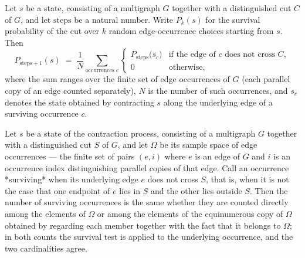 \begin{lemma}
\label{KargerTrace.survivalEventProb_succ}
\leanok
{}
Let $s$ be a state, consisting of a multigraph $G$ together with a distinguished cut $C$
of $G$, and let $\mathrm{steps}$ be a natural number. Write $P_k(s)$ for the survival
probability of the cut over $k$ random edge-occurrence choices starting from $s$. Then
\[
P_{\mathrm{steps}+1}(s)
  \;=\;
  \frac{1}{N}\sum_{\text{occurrences } c}
  \begin{cases}
P_{\mathrm{steps}}\!\bigl(s_c\bigr) & \text{if the edge of } c \text{ does not cross }
C,\\[4pt]
    0 & \text{otherwise,}
  \end{cases}
\]
where the sum ranges over the finite set of edge occurrences of $G$ (each parallel copy
of an edge counted separately), $N$ is the number of such occurrences, and $s_c$ denotes
the state obtained by contracting $s$ along the underlying edge of a surviving
occurrence $c$.
\end{lemma}

\begin{lemma}
\label{KargerTrace.edgeChoice_attach_filter_card}
\leanok
{}
Let $s$ be a state of the contraction process, consisting of a multigraph $G$ together
with a distinguished cut $S$ of $G$, and let $\Omega$ be its sample space of edge
occurrences — the finite set of pairs $(e, i)$ where $e$ is an edge of $G$ and $i$ is an
occurrence index distinguishing parallel copies of that edge. Call an occurrence
*surviving* when its underlying edge $e$ does not cross $S$, that is, when it is not the
case that one endpoint of $e$ lies in $S$ and the other lies outside $S$. Then the
number of surviving occurrences is the same whether they are counted directly among the
elements of $\Omega$ or among the elements of the equinumerous copy of $\Omega$ obtained
by regarding each member together with the fact that it belongs to $\Omega$; in both
counts the survival test is applied to the underlying occurrence, and the two
cardinalities agree.
\end{lemma}

